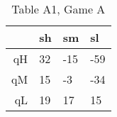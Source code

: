 \begin{table}[ht]
\centering
\begin{tabular}{rlll}
  \hline
 & sh & sm & sl \\ 
  \hline
qH &  32 & -15 & -59 \\ 
  qM &  15 &  -3 & -34 \\ 
  qL &  19 &  17 &  15 \\ 
   \hline
\end{tabular}
\caption{Table A1, Game A} 
\end{table}

